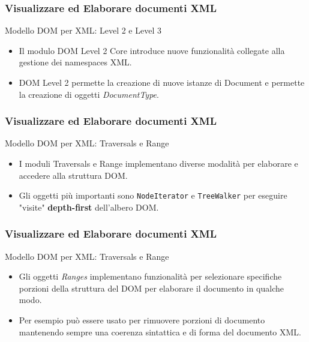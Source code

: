 \begin{frame}
    \frametitle{Visualizzare ed Elaborare documenti XML}
    \addtocounter{nframe}{1}

     \begin{block}{Modello DOM per XML: Level 2 e Level 3}
        \begin{itemize}
            \item Il modulo DOM Level 2 Core introduce nuove funzionalità collegate alla gestione dei namespaces XML.
            \item DOM Level 2 permette la creazione di nuove istanze di Document e permette la creazione di oggetti \textit{DocumentType}.
        \end{itemize}
       
     \end{block}
    
\end{frame}

\begin{frame}
    \frametitle{Visualizzare ed Elaborare documenti XML}
    \addtocounter{nframe}{1}

     \begin{block}{Modello DOM per XML: Traversals e Range}
        \begin{itemize}
            \item I moduli Traversals e Range implementano diverse modalità per elaborare e accedere alla struttura DOM.
            \item Gli oggetti più importanti sono \texttt{NodeIterator} e \texttt{TreeWalker} per eseguire "visite" \textbf{depth-first} dell'albero DOM.
        \end{itemize}
       
     \end{block}

\end{frame}

\begin{frame}
    \frametitle{Visualizzare ed Elaborare documenti XML}
    \addtocounter{nframe}{1}

     \begin{block}{Modello DOM per XML: Traversals e Range}
        \begin{itemize}
            \item Gli oggetti \textit{Ranges} implementano funzionalità per selezionare specifiche porzioni della struttura del DOM per elaborare il documento in qualche modo.
            \item Per esempio può essere usato per rimuovere porzioni di documento mantenendo sempre una coerenza sintattica e di forma del documento XML.
        \end{itemize}
       
     \end{block}
          
\end{frame}


